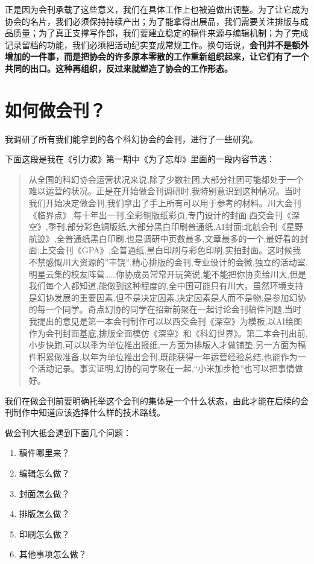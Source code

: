 正是因为会刊承载了这些意义，我们在具体工作上也被迫做出调整。为了让它成为协会的名片，我们必须保持持续产出；为了能拿得出展品，我们需要关注排版与成品质量；为了真正支撑写作部，我们要建立稳定的稿件来源与编辑机制；为了完成记录留档的功能，我们必须把活动纪实变成常规工作。换句话说，\textbf{会刊并不是额外增加的一件事，而是把协会的许多原本零散的工作重新组织起来，让它们有了一个共同的出口。这种再组织，反过来就塑造了协会的工作形态。}

\section{如何做会刊？}\label{ux5982ux4f55ux505aux4f1aux520a}

我调研了所有我们能拿到的各个科幻协会的会刊，进行了一些研究。

下面这段是我在《引力波》第一期中《为了忘却》里面的一段内容节选：

\begin{quote}
从全国的科幻协会运营状况来说,除了少数社团,大部分社团可能都处于一个难以运营的状况。正是在开始做会刊调研时,我特别意识到这种情况。当时我们开始决定做会刊,我们拿出了手上所有可以用于参考的材料。川大会刊《临界点》,每十年出一刊,全彩铜版纸彩页,专门设计的封面;西交会刊《深空》,季刊,部分彩色铜版纸,大部分黑白印刷普通纸,AI封面;北航会刊《星野航迹》,全普通纸黑白印刷,也是调研中页数最多,文章最多的一个,最好看的封面;上交会刊《GPA》,全普通纸,黑白印刷与彩色印刷,实拍封面。这时候我不禁感慨川大资源的''丰饶'',精心排版的会刊,专业设计的会徽,独立的活动室,明星云集的校友阵营\ldots\ldots 你协成员常常开玩笑说,能不能把你协卖给川大,但是我们每个人都知道,能做到这种程度的,全中国可能只有川大。虽然环境支持是幻协发展的重要因素,但不是决定因素,决定因素是人而不是物,是参加幻协的每一个同学。奇点幻协的同学在招新前聚在一起讨论会刊稿件问题,当时我提出的意见是第一本会刊制作可以以西交会刊《深空》为模板,以AI绘图作为会刊封面基底,排版全面模仿《深空》和《科幻世界》。第二本会刊出前,小步快跑,可以以季为单位推出报纸,一方面为排版人才做铺垫,另一方面为稿件积累做准备,以年为单位推出会刊,既能获得一年运营经验总结,也能作为一个活动记录。事实证明,幻协的同学聚在一起,``小米加步枪''也可以把事情做好。
\end{quote}

我们在做会刊前要明确托举这个会刊的集体是一个什么状态，由此才能在后续的会刊制作中知道应该选择什么样的技术路线。

做会刊大抵会遇到下面几个问题：

\begin{enumerate}
\def\labelenumi{\arabic{enumi}.}
\tightlist
\item
  稿件哪里来？
\item
  编辑怎么做？
\item
  封面怎么做？
\item
  排版怎么做？
\item
  印刷怎么做？
\item
  其他事项怎么做？
\end{enumerate}

